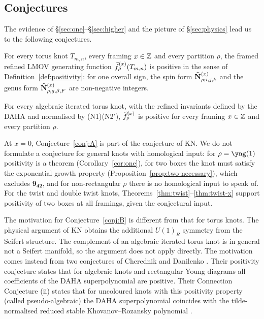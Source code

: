 \subsection{Conjectures}\label{sec:conj}
The evidence of \S\ref{sec:one}--\S\ref{sec:higher} and the picture of \S\ref{sec:physics} lead us to the following conjectures.
\begin{conjecture}\label{conj:A}
For every torus knot $T_{m,n}$, every framing $x\in\mathbb{Z}$ and every partition $\rho$, the framed refined LMOV generating function $\widehat{f}^{(x)}_\rho(T_{m,n})$ is positive in the sense of Definition~\ref{def:positivity}:
for one overall sign, the spin form $\widehat{\mathbf{N}}^{(x)}_{\rho;i,j,k}$ and the genus form $\widehat{\mathbf{N}}^{(x)}_{\rho,g,\beta,F}$ are non-negative integers.
\end{conjecture}
\begin{conjecture}\label{conj:B}
For every algebraic iterated torus knot, with the refined invariants defined by the DAHA and normalised by {\rm(N1)(N2$'$)},
$\widehat{f}^{(x)}_\rho$ is positive for every framing $x\in\mathbb{Z}$ and every partition $\rho$.
\end{conjecture}
At $x=0$, Conjecture~\ref{conj:A} is part of the conjecture of KN.
We do not formulate a conjecture for general knots with homological input:
for $\rho=\yng(1)$ positivity is a theorem (Corollary~\ref{cor:one}),
for two boxes the knot must satisfy the exponential growth property (Proposition~\ref{prop:two-necessary}), which excludes $\mathbf{9_{42}}$,
and for non-rectangular $\rho$ there is no homological input to speak of.
For the twist and double twist knots, Theorems~\ref{thm:twist}--\ref{thm:twist-x} support positivity of two boxes at all framings, given the conjectural input.

The motivation for Conjecture~\ref{conj:B} is different from that for torus knots.
The physical argument of KN obtains the additional $U(1)_R$ symmetry from the Seifert structure.
The complement of an algebraic iterated torus knot is in general not a Seifert manifold, so the argument does not apply directly.
The motivation comes instead from two conjectures of Cherednik and Danilenko \cite{Cherednik14}.
Their positivity conjecture states that for algebraic knots and rectangular Young diagrams all coefficients of the DAHA superpolynomial are positive.
Their Connection Conjecture (ii) states that for uncoloured knots with this positivity property (called pseudo-algebraic) the DAHA superpolynomial coincides with the tilde-normalised reduced stable Khovanov--Rozansky polynomial \cite{Khovanov05}.


